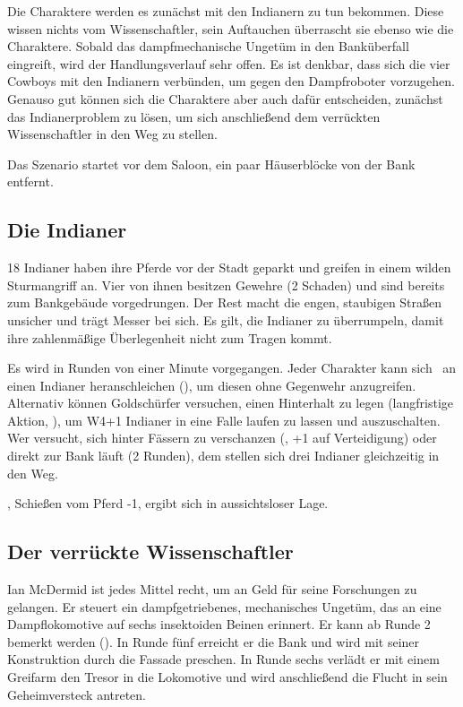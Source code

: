 {		Die Charaktere werden es zunächst mit den Indianern zu tun bekommen. Diese wissen nichts vom Wissenschaftler, sein Auftauchen überrascht sie ebenso wie die Charaktere. Sobald das dampfmechanische Ungetüm in den Banküberfall eingreift, wird der Handlungsverlauf sehr offen. Es ist denkbar, dass sich die vier Cowboys mit den Indianern verbünden, um gegen den Dampfroboter vorzugehen. Genauso gut können sich die Charaktere aber auch dafür entscheiden, zunächst das Indianerproblem zu lösen, um sich anschließend dem verrückten Wissenschaftler in den Weg zu stellen.

		Das Szenario startet vor dem Saloon, ein paar Häuserblöcke von der Bank entfernt.

		\subsection{Die Indianer}

		18 Indianer haben ihre Pferde vor der Stadt geparkt und greifen in einem wilden Sturmangriff an. Vier von ihnen besitzen Gewehre (2 Schaden) und sind bereits zum Bankgebäude vorgedrungen. Der Rest macht die engen, staubigen Straßen unsicher und trägt Messer bei sich. Es gilt, die Indianer zu überrumpeln, damit ihre zahlenmäßige Überlegenheit nicht zum Tragen kommt.

		Es wird in Runden von einer Minute vorgegangen. Jeder Charakter kann sich \zB\ an einen Indianer heranschleichen (), um diesen ohne Gegenwehr anzugreifen. Alternativ können Goldschürfer versuchen, einen Hinterhalt zu legen (langfristige Aktion, ), um W4+1 Indianer in eine Falle laufen zu lassen und auszuschalten. Wer versucht, sich hinter Fässern zu verschanzen (, +1 auf Verteidigung) oder direkt zur Bank läuft (2 Runden), dem stellen sich drei Indianer gleichzeitig in den Weg.

		, Schießen vom Pferd -1, ergibt sich in aussichtsloser Lage.

		\subsection{Der verrückte Wissenschaftler}

		Ian McDermid ist jedes Mittel recht, um an Geld für seine Forschungen zu gelangen. Er steuert ein dampfgetriebenes, mechanisches Ungetüm, das an eine Dampflokomotive auf sechs insektoiden Beinen erinnert. Er kann ab Runde 2 bemerkt werden (). In Runde fünf erreicht er die Bank und wird mit seiner Konstruktion durch die Fassade preschen. In Runde sechs verlädt er mit einem Greifarm den Tresor in die Lokomotive und wird anschließend die Flucht in sein Geheimversteck antreten.

}
